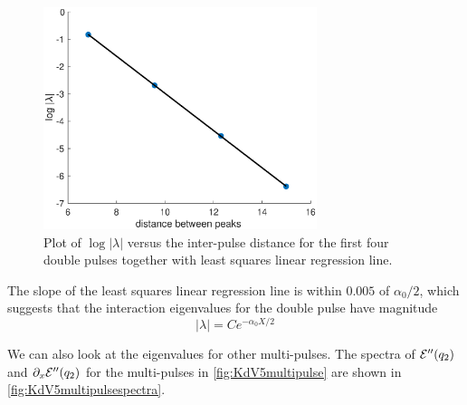 \documentclass[thesis.tex]{subfiles}
\begin{document}
\begin{figure}[H]
\begin{center}
\includegraphics[width=8cm]{images/kdv5numerics/doubleeigdecay.eps}
\caption{Plot of $\log |\lambda|$ versus the inter-pulse distance for the first four double pulses together with least squares linear regression line.}
\label{fig:KdV5doubleeigdecay}
\end{center}
\end{figure}

The slope of the least squares linear regression line is within $0.005$ of $\alpha_0/2$, which suggests that the interaction eigenvalues for the double pulse have magnitude
\[
|\lambda| = C e^{-\alpha_0 X/2}
\] 

We can also look at the eigenvalues for other multi-pulses. The spectra of $\mathcal{E}''(q_2)$ and $\partial_x \mathcal{E}''(q_2)$ for the multi-pulses in \cref{fig:KdV5multipulse} are shown in \cref{fig:KdV5multipulsespectra}. 
\end{document}
